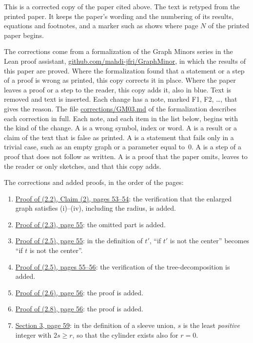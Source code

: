 
This is a corrected copy of the paper cited above. The text is retyped from the printed paper.
It keeps the paper's wording and the numbering of its results, equations and footnotes, and a
marker such as  shows where page $N$ of the printed paper begins.

The corrections come from a formalization of the Graph Minors series in the Lean proof
assistant, \href{https://github.com/mahdi-jfri/GraphMinor}{github.com/mahdi-jfri/GraphMinor},
in which the results of this paper are proved. Where the formalization found that a statement
or a step of a proof is wrong as printed, this copy corrects it in place. Where the paper leaves a proof or a step to the reader, this copy adds it, also in blue. Text  is removed and text  is inserted. Each change has a note, marked
\textcolor{fixcolor}{\sffamily F1}, \textcolor{fixcolor}{\sffamily F2}, \dots, that gives the
reason. The file
\href{https://github.com/mahdi-jfri/GraphMinor/blob/main/corrections/GM03.md}{corrections/GM03.md}
of the formalization describes each correction in full. Each note, and each item in the list below, begins with the kind of the change. A  is a wrong symbol, index or word. A  is a result or a claim of the text that is false as printed. A  is a statement that fails only in a trivial case, such as an empty graph or a parameter equal to~$0$. A  is a step of a proof that does not follow as written. A  is a proof that the paper omits, leaves to the reader or only sketches, and that this copy adds.

The corrections and added proofs, in the order of the pages:
\begin{enumerate}\setlength{\itemsep}{1pt}
\item {}\hyperref[fix:2.2-claim2-proof-added]{Proof of (2.2), Claim (2), pages 53--54}: the verification that the enlarged graph satisfies (i)--(iv), including the radius, is added.
\item {}\hyperref[fix:2.3-proof-added]{Proof of (2.3), page 55}: the omitted part is added.
\item {}\hyperref[fix:2.5-center]{Proof of (2.5), page 55}: in the definition of $t'$, ``if $t'$ is not the center'' becomes ``if $t$ is not the center''.
\item {}\hyperref[fix:2.5-proof-added]{Proof of (2.5), pages 55--56}: the verification of the tree-decomposition is added.
\item {}\hyperref[fix:2.6-proof-added]{Proof of (2.6), page 56}: the proof is added.
\item {}\hyperref[fix:2.8-proof-added]{Proof of (2.8), page 56}: the proof is added.
\item {}\hyperref[fix:3-sleeve]{Section 3, page 59}: in the definition of a sleeve union, $s$ is the least \emph{positive} integer with $2s\ge r$, so that the cylinder exists also for $r=0$.
\end{enumerate}

